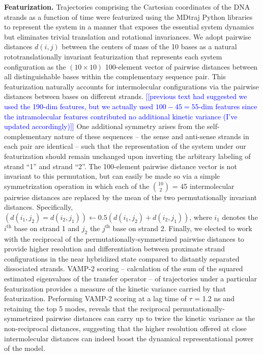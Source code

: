 \documentclass[journal=jpcbfk,manuscript=article]{achemso}
\newcommand*{\noteb}[1]{\textcolor{blue}{[[#1]]}}		%
\begin{document}
\textbf{Featurization.} Trajectories comprising the Cartesian coordinates of the DNA strands as a function of time were featurized using the MDtraj Python libraries \citep{McGibbon2015MDTraj:Trajectories} to represent the system in a manner that exposes the essential system dynamics but eliminates trivial translation and rotational invariances. We adopt pairwise distances $d(i,j)$ between the centers of mass of the 10 bases as a natural rototranslationally invariant featurization that represents each system configuration as the $(10 \times 10)$ 100-element vector of pairwise distances between all distinguishable bases within the complementary sequence pair. This featurization naturally accounts for intermolecular configurations via the pairwise distances between bases on different strands. \noteb{previous text had suggested we used the 190-dim features, but we actually used $100-45 = 55$-dim features since the intramolecular features contributed no additional kinetic variance (I've updated accordingly)} One additional symmetry arises from the self-complementary nature of these sequences -- the sense and anti-sense strands in each pair are identical -- such that the representation of the system under our featurization should remain unchanged upon inverting the arbitrary labeling of strand ``1'' and strand ``2''.\citep{Sengupta2019AutomatedSelf-assembly} The 100-element pairwise distance vector is not invariant to this permutation, but can easily be made so via a simple symmetrization operation in which each of the $10 \choose 2$ =  45 intermolecular pairwise distances are replaced by the mean of the two permutationally invariant distances. Specifically, $\left( d(i_1,j_2) = d(i_2,j_1) \right) \leftarrow 0.5\left( d(i_1,j_2) + d(i_2,j_1) \right)$, where $i_1$ denotes the $i^\mathrm{th}$ base on strand 1 and $j_2$ the $j^\mathrm{th}$ base on strand 2. \citep{Sengupta2019AutomatedSelf-assembly} Finally, we elected to work with the reciprocal of the permutationally-symmetrized pairwise distances to provide higher resolution and differentiation between proximate strand configurations in the near hybridized state compared to distantly separated dissociated strands. VAMP-2 scoring -- calculation of the sum of the squared estimated eigenvalues of the transfer operator -- of trajectories under a particular featurization provides a measure of the kinetic variance carried by that featurization. \citep{Noe2013ASystems, Noe2015KineticSimulation, Scherer2019VariationalKinetics, Wu2020VariationalData} Performing VAMP-2 scoring at a lag time of $\tau$ = 1.2 ns and retaining the top 5 modes, reveals that the reciprocal permutationally-symmetrized pairwise distances can carry up to twice the kinetic variance as the non-reciprocal distances, suggesting that the higher resolution offered at close intermolecular distances can indeed boost the dynamical representational power of the model.
\end{document}
